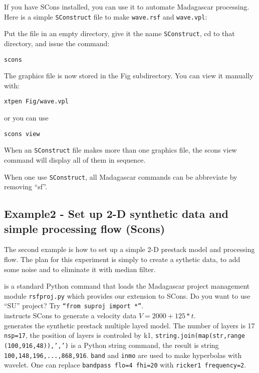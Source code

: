 \begin{enumerate}
If you have SCons installed, you can use it to automate Madagascar
processing. Here is a simple \texttt{SConstruct} file to make
\texttt{wave.rsf} and
\texttt{wave.vpl}:


Put the file in an empty directory, give it the name
\texttt{SConstruct}, cd to that directory, and issue the command:
\begin{verbatim}
scons
\end{verbatim}
The graphics file is now stored in the Fig subdirectory. You can view it
manually with:
\begin{verbatim}
xtpen Fig/wave.vpl
\end{verbatim}
or you can use
\begin{verbatim}
scons view
\end{verbatim}
When an \texttt{SConstruct} file makes more than one graphics file, the scons
view command will display all of them in sequence. 

When one use \texttt{SConstruct}, all Madagascar commands can be abbreviate by
removing ``sf''.

\end{enumerate}

\subsection{Example2 - Set up 2-D synthetic data and simple processing flow (Scons) }

The second example is how to set up a simple 2-D prestack model and
processing flow.  The plan for this experiment is simply to create a
sythetic data, to add some noise and to eliminate it with median
filter.


%
is a standard Python command that loads the Madagascar project
management module \texttt{rsfproj.py} which provides our extension to
SCons. Do you want to use ``SU'' project? Try \texttt{``from suproj
import *''}.\\


%
instructs SCons to generate a velocity data \texttt{$V=2000+125*t$}. \\


%
generates the synthetic prestack multiple layed model. The number of layers 
is 17 \texttt{nsp=17}, the position of layers is controled by k1, 
\texttt{string.join(map(str,range (100,916,48)),',')} is a Python string 
command, the result is string
\texttt{100,148,196,...,868,916}. \texttt{band} and
\texttt{inmo} are used to make hyperbolas with wavelet. One can replace 
\texttt{bandpass flo=4 fhi=20} with \texttt{ricker1 frequency=2}.\\


